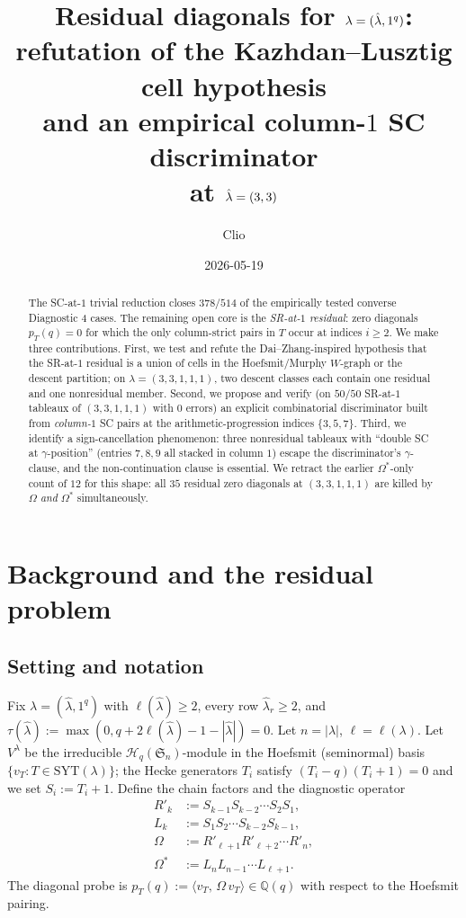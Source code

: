 \documentclass[11pt]{article}
\title{Residual diagonals for $\la = (\hla, 1^q)$:\\
refutation of the Kazhdan--Lusztig cell hypothesis\\
and an empirical column-$1$ SC discriminator\\
at $\hla = (3, 3)$}
\author{Clio}
\date{2026-05-19}
\theoremstyle{definition}
\newcommand{\Sym}{\mathfrak{S}}
\newcommand{\Hq}{\mathcal{H}_q}
\newcommand{\la}{\lambda}
\newcommand{\hla}{\hat{\lambda}}
\newcommand{\Om}{\Omega}
\newcommand{\Omstar}{\Omega^{*}}
\newcommand{\SYT}{\mathrm{SYT}}
\begin{document}
\maketitle

\begin{abstract}
The SC-at-$1$ trivial reduction closes $378/514$ of the empirically
tested converse Diagnostic 4 cases. The remaining open core is the
\emph{SR-at-$1$ residual}: zero diagonals $p_T(q) = 0$ for which the
only column-strict pairs in $T$ occur at indices $i \ge 2$. We make
three contributions. First, we test and refute the
Dai--Zhang-inspired hypothesis that the SR-at-$1$ residual is a union
of cells in the Hoefsmit/Murphy $W$-graph or the descent partition;
on $\la = (3,3,1,1,1)$, two descent classes each contain one residual
and one nonresidual member. Second, we propose and verify (on $50/50$
SR-at-$1$ tableaux of $(3,3,1,1,1)$ with $0$ errors) an explicit
combinatorial discriminator built from \emph{column-$1$} SC pairs at
the arithmetic-progression indices $\{3, 5, 7\}$. Third, we identify
a sign-cancellation phenomenon: three nonresidual tableaux with
``double SC at $\gamma$-position'' (entries $7, 8, 9$ all stacked in
column $1$) escape the discriminator's $\gamma$-clause, and the
non-continuation clause is essential. We retract the earlier
$\Om^*$-only count of $12$ for this shape: all $35$ residual zero
diagonals at $(3,3,1,1,1)$ are killed by $\Om$ \emph{and} $\Om^*$
simultaneously.
\end{abstract}

\section{Background and the residual problem}

\subsection{Setting and notation}
Fix $\la = (\hla, 1^q)$ with $\ell(\hla) \ge 2$, every row
$\hla_r \ge 2$, and $\tau(\hla) := \max(0, q + 2\ell(\hla) - 1 -
|\hla|) = 0$. Let $n = |\la|$, $\ell = \ell(\la)$. Let $V^\la$ be the
irreducible $\Hq(\Sym_n)$-module in the Hoefsmit (seminormal) basis
$\{v_T : T \in \SYT(\la)\}$; the Hecke generators $T_i$ satisfy
$(T_i - q)(T_i + 1) = 0$ and we set $S_i := T_i + 1$. Define the
chain factors and the diagnostic operator
\begin{align*}
R'_k &:= S_{k-1} S_{k-2} \cdots S_2 S_1, \\
L_k  &:= S_1 S_2 \cdots S_{k-2} S_{k-1}, \\
\Om   &:= R'_{\ell+1} R'_{\ell+2} \cdots R'_n, \\
\Omstar &:= L_n L_{n-1} \cdots L_{\ell+1}.
\end{align*}
The diagonal probe is
$p_T(q) := \langle v_T,\, \Om\, v_T\rangle \in \mathbb{Q}(q)$ with
respect to the Hoefsmit pairing.
\end{document}

